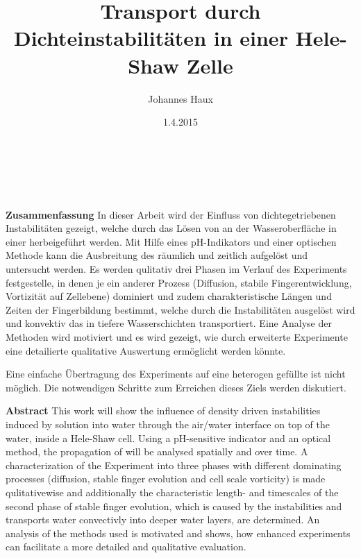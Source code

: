 \documentclass[twoside, a4paper, DIV=11,twocolumn]{book}
\title{Transport durch Dichteinstabilitäten in einer Hele-Shaw Zelle}
\author{Johannes Haux}
\date{1.4.2015}
\begin{document}
\onecolumn


\chapter*{\,}

  \noindent \textbf{Zusammenfassung} \hspace{0.3cm} In dieser Arbeit wird der Einfluss von dichtegetriebenen Instabilitäten gezeigt, welche durch das Lösen von \COT an der Wasseroberfläche in einer \HSC herbeigeführt werden. 
  Mit Hilfe eines pH-Indikators und einer optischen Methode kann die Ausbreitung des \COT räumlich und zeitlich aufgelöst und untersucht werden. 
  Es werden qulitativ drei Phasen im Verlauf des Experiments festgestelle, in denen je ein anderer Prozess (Diffusion, stabile Fingerentwicklung, Vortizität auf Zellebene) dominiert und zudem charakteristische Längen und Zeiten der Fingerbildung bestimmt, welche durch die Instabilitäten ausgelöst wird und konvektiv das \COT in tiefere Wasserschichten transportiert.
  Eine Analyse der Methoden wird motiviert und es wird gezeigt, wie durch erweiterte Experimente eine detailierte qualitative Auswertung ermöglicht werden könnte.
  
  Eine einfache Übertragung des Experiments auf eine heterogen gefüllte \HSC ist nicht möglich. Die notwendigen Schritte zum Erreichen dieses Ziels werden diskutiert.
  
  \vspace{1.5cm}
 
  \noindent \textbf{Abstract} \hspace{0.3cm} This work will show the influence of density driven instabilities induced by \COTm solution into water through the air/water interface on top of the water, inside a Hele-Shaw cell. 
  Using a pH-sensitive indicator and an optical method, the propagation of \COT will be analysed spatially and over time.
  A characterization of the Experiment into three phases with different dominating processes (diffusion, stable finger evolution and cell scale vorticity) is made qulitativewise and additionally the characteristic length- and timescales of the second phase of stable finger evolution, which is caused by the instabilities and transports water convectivly into deeper water layers, are determined. 
  An analysis of the methods used is motivated and shows, how enhanced experiments can facilitate a more detailed and qualitative evaluation. 
  
\end{document}
